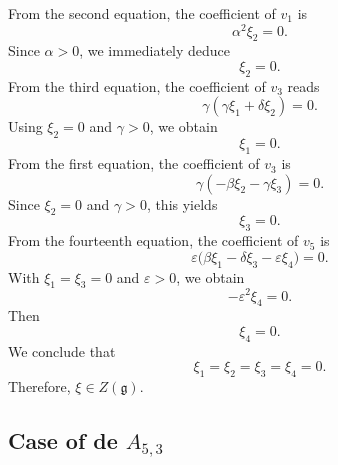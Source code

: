 \documentclass[10pt]{article}
\begin{document}
From the second equation, the coefficient of \(v_1\) is
\[
\alpha^2 \xi_2 = 0.
\]
Since \(\alpha>0\), we immediately deduce
\[
\xi_2 = 0.
\]
From the third equation, the coefficient of \(v_3\) reads
\[
\gamma(\gamma \xi_1 + \delta \xi_2) = 0.
\]
Using \(\xi_2=0\) and \(\gamma>0\), we obtain
\[
\xi_1 = 0.
\]
From the first equation, the coefficient of \(v_3\) is
\[
\gamma(-\beta \xi_2 - \gamma \xi_3) = 0.
\]
Since \(\xi_2=0\) and \(\gamma>0\), this yields
\[
\xi_3 = 0.
\]
From the fourteenth equation, the coefficient of \(v_5\) is
\[
\varepsilon\big(\beta \xi_1 - \delta \xi_3 - \varepsilon \xi_4\big)=0.
\]
With \(\xi_1=\xi_3=0\) and \(\varepsilon>0\), we obtain
\[
-\varepsilon^2 \xi_4 = 0.
\]
Then \[
 \xi_4=0.
\]
We conclude that
\[
\xi_1=\xi_2=\xi_3=\xi_4=0 .
\]
Therefore, $\xi\in Z(\mathfrak{g}).$




\subsection{Case of de $A_{5,3}$}
\end{document}
